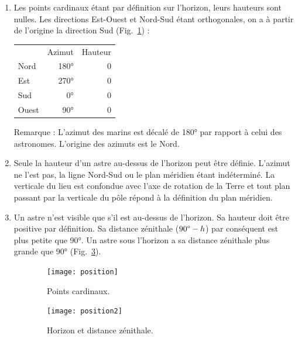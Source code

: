 \documentclass[a4paper,10pt]{report}
\renewcommand{\deg}{\ensuremath{\degree}}
\begin{document}
\begin{Answer}
  \begin{enumerate}
  \item Les points cardinaux étant par définition sur l'horizon, leurs
    hauteurs sont nulles. Les directions Est-Ouest et Nord-Sud étant
    orthogonales, on a à partir de l'origine la direction Sud
    (Fig.~\ref{position}) :
    \begin{center}
      \begin{tabular}{lrr}
        \toprule
        & Azimut & Hauteur \\ 
        \cmidrule(r){2-3}
        Nord  & 180° & 0 \\ 
        Est   & 270° & 0 \\ 
        Sud   & 0°   & 0 \\ 
        Ouest & 90°  & 0 \\ 
        \bottomrule
      \end{tabular}
    \end{center}
    Remarque : L'azimut des marins est décalé de 180° par rapport à
    celui des astronomes. L'origine des azimuts est le Nord.

  \item Seule la hauteur d'un astre au-dessus de l'horizon peut être
    définie. L'azimut ne l'est pas, la ligne Nord-Sud ou le plan
    méridien étant indéterminé. La verticale du lieu est confondue
    avec l'axe de rotation de la Terre et tout plan passant par la
    verticale du pôle répond à la définition du plan méridien.

  \item Un astre n'est visible que s'il est au-dessus de l'horizon. Sa
    hauteur doit être positive par définition. Sa distance zénithale
    ($90\deg - h$) par conséquent est plus petite que 90°.  Un astre
    sous l'horizon a sa distance zénithale plus grande que 90°
    (Fig.~\ref{position2}).
  \end{enumerate}

  \begin{figure}
    \centering
    \begin{subfigure}[b]{0.4\textwidth}
      \centering
      \texttt{[image: position]}
      \caption{Points cardinaux.}
      \label{position}
    \end{subfigure}
    \begin{subfigure}[b]{0.4\textwidth}
      \centering
      \texttt{[image: position2]}
      \caption{Horizon et distance zénithale.}
      \label{position2}
    \end{subfigure}
    \caption{}
  \end{figure}
\end{Answer}
\end{document}
